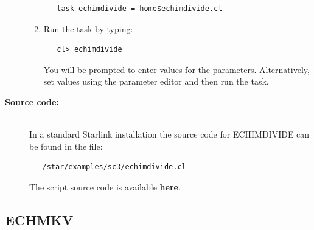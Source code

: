 \documentclass[twoside,11pt]{article}
\newcommand{\htmlref}[2]{#1}
\newenvironment{latexonly}{}{}
\newcommand{\xlabel}[1]{}
\renewcommand{\_}{\texttt{\symbol{95}}}
\begin{document}
\begin{description}
\begin{enumerate}
\begin{verbatim}
   task echimdivide = home$echimdivide.cl
\end{verbatim}

\item Run the task by typing:

\begin{verbatim}
   cl> echimdivide
\end{verbatim}

      You will be prompted
      to enter values for the parameters. Alternatively, set values
      using the parameter editor and then run the task.
\end{enumerate}

\item [{\bf Source code:}] \mbox{} \\
\begin{latexonly}
In a standard Starlink installation the source code for ECHIMDIVIDE can be
found in the file:
\begin{verbatim}
   /star/examples/sc3/echimdivide.cl
\end{verbatim}
\end{latexonly}
\begin{htmlonly}
      The script source code is available
      \htmlref{{\bf here}}{se_echimdivide_source}.
\end{htmlonly}

\end{description}

\newpage
\subsection{\label{se_echmkv}\xlabel{ECHMKV}ECHMKV}
\end{document}
